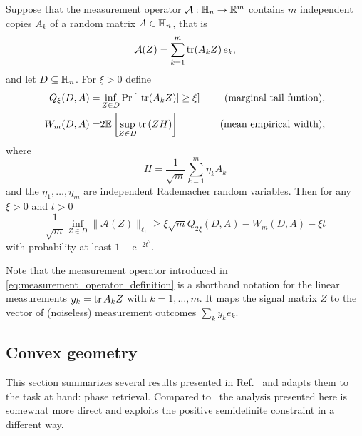 \begin{theorem} \label{thm:mendelson}
  Suppose that the measurement operator $\mathcal{A}:\mathbb{H}_n \to \mathbb{R}^m$ contains $m$ independent copies $ A_k$ of a random matrix $ A \in \mathbb{H}_n$, that is
  \begin{equation}
    \label{eq:measurement_operator_definition}
    \mathcal{A}( Z) = \sum_{k=1}^m \operatorname{tr} ( A_k  Z) \,  e_k,
  \end{equation}
  and let $D \subseteq \mathbb{H}_n$.
  For $\xi >0$ define
  \begin{align}
    Q_\xi (D,  A) =& \inf_{ Z \in D}\mathrm{Pr} \left[ | \operatorname{tr} ( A_k  Z) | \geq \xi \right] \quad &\textrm{(marginal tail funtion)}, \label{eq:marginal_tail_function}\\
    W_m (D,  A) =& 2 \mathbb{E} \left[ \sup_{ Z \in D} \operatorname{tr} \left(  Z  H \right) \right] \quad &\textrm{(mean empirical width)},
  \end{align}
  where
  \begin{equation}
     H= \frac{1}{\sqrt{m}} \sum_{k=1}^m \eta_k  A_k
  \end{equation}
  and the $\eta_1,\ldots,\eta_m$ are independent Rademacher random variables.
  Then for any $\xi >0$ and $t >0$
  \begin{equation}
    \frac{1}{\sqrt{m}}\inf_{ Z \in D} \| \mathcal{A}( Z) \|_{\ell_1} \geq \xi \sqrt{m} Q_{2\xi}(D,  A) -  W_m (D,  A)-\xi t \label{eq:mendelson}
  \end{equation}
  with probability at least $1-\mathrm{e}^{-2t^2}$.
\end{theorem}

Note that the measurement operator introduced in \cref{eq:measurement_operator_definition} is a shorthand notation for the linear measurements $y_k = \operatorname{tr}  A_k  Z$ with $k=1,\ldots,m$.
It maps the signal matrix $ Z$ to the vector of (noiseless) measurement outcomes $\sum_k y_k  e_k$.


\subsection{Convex geometry}

This section summarizes several results presented in Ref.~\cite{kabanava_stable_2016} and adapts them to the task at hand: phase retrieval.
Compared to~\cite{kabanava_stable_2016} the analysis presented here is somewhat more direct and exploits the positive semidefinite constraint in a different way.

